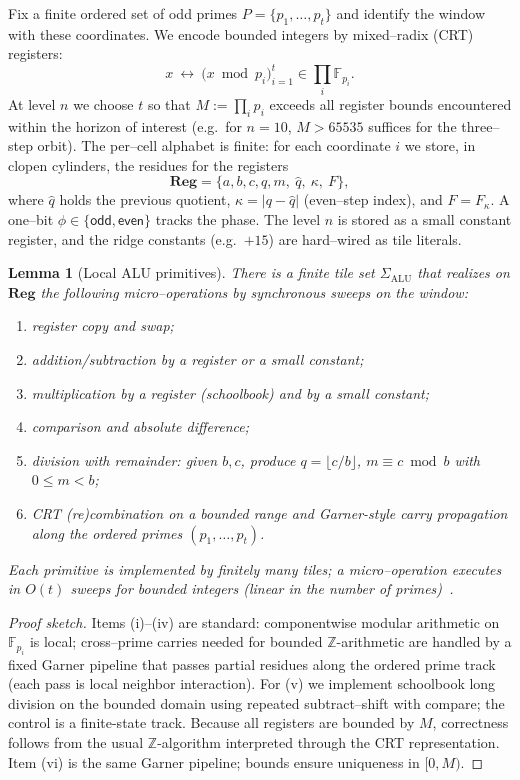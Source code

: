 \documentclass[12pt]{article}
\newtheorem{lemma}[theorem]{Lemma}
\numberwithin{equation}{section}
\newcommand{\Z}{\mathbb{Z}}
\begin{document}
Fix a finite ordered set of odd primes \(P=\{p_1,\dots,p_t\}\) and identify the window with these coordinates. We encode bounded integers by mixed–radix (CRT) registers:
\[
x\ \longleftrightarrow\ \big(x \bmod p_i\big)_{i=1}^t \in \prod_{i}\mathbb{F}_{p_i}.
\]
At level \(n\) we choose \(t\) so that \(M:=\prod_i p_i\) exceeds all register bounds encountered within the horizon of interest (e.g.\ for \(n{=}10\), \(M>65535\) suffices for the three–step orbit). The per–cell alphabet is finite: for each coordinate \(i\) we store, in clopen cylinders, the residues for the registers
\[
\mathbf{Reg}=\{a,b,c,q,m,\ \hat{q},\ \kappa,\ F\},
\]
where \(\hat{q}\) holds the previous quotient, \(\kappa=|q-\hat q|\) (even–step index), and \(F=F_{\kappa}\). A one–bit \(\phi\in\{\textsf{odd},\textsf{even}\}\) tracks the phase. The level \(n\) is stored as a small constant register, and the ridge constants (e.g.\ \(+15\)) are hard–wired as tile literals.

\begin{lemma}[Local ALU primitives]\label{lem:alu}
There is a finite tile set \(\Sigma_{\mathrm{ALU}}\) that realizes on \(\mathbf{Reg}\) the following micro–operations by synchronous sweeps on the window:
\begin{enumerate}[label=(\arabic*), itemsep=2pt]
\item register copy and swap;
\item addition/subtraction by a register or a small constant;
\item multiplication by a register (schoolbook) and by a small constant;
\item comparison and absolute difference;
\item division with remainder: given \(b,c\), produce \(q=\lfloor c/b\rfloor\), \(m\equiv c\bmod b\) with \(0\le m<b\);
\item CRT (re)combination on a bounded range and Garner-style carry propagation along the ordered primes \((p_1,\dots,p_t)\).
\end{enumerate}
Each primitive is implemented by finitely many tiles; a micro–operation executes in \(O(t)\) sweeps for bounded integers (linear in the number of primes)~\cite{SpivackUGPFormalization,ugp-lean}.
\end{lemma}

\begin{proof}[Proof sketch]
Items (i)–(iv) are standard: componentwise modular arithmetic on \(\mathbb{F}_{p_i}\) is local; cross–prime carries needed for bounded \(\Z\)-arithmetic are handled by a fixed Garner pipeline that passes partial residues along the ordered prime track (each pass is local neighbor interaction). For (v) we implement schoolbook long division on the bounded domain using repeated subtract–shift with compare; the control is a finite-state track. Because all registers are bounded by \(M\), correctness follows from the usual \(\Z\)-algorithm interpreted through the CRT representation. Item (vi) is the same Garner pipeline; bounds ensure uniqueness in \([0,M)\).
\end{proof}
\end{document}
